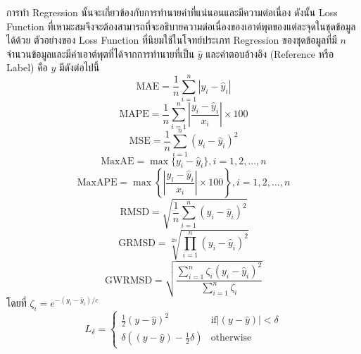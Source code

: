 การทำ Regression นั้นจะเกี่ยวข้องกับการทำนายค่าที่แน่นอนและมีความต่อเนื่อง ดังนั้น Loss Function ที่เหามะสมจึงจะต้องสามารถที่จะอธิบายความต่อเนื่องของเอาต์พุตของแต่ละจุดในชุดข้อมูลได้ด้วย ตัวอย่างของ Loss Function ที่นิยมใช้ในโจทย์ประเภท Regression ของชุดข้อมูลที่มี
$n$ จำนวนข้อมูลและมีค่าเอาต์พุตที่ได้จากการทำนายที่เป็น $\hat{y}$ และคำตอบอ้างอิง (Reference หรือ Label) คือ $y$ มีดังต่อไปนี้
%
\begin{equation}\label{eq:mae}
    \text{MAE} = \frac{1}{n} \sum_{i=1}^{n} | y_{i} - \hat{y}_{i} |
\end{equation}
%
\begin{equation}\label{eq:mape}
    \text{MAPE} = \frac{1}{n} \sum_{i=1}^{n} \left| \frac{y_{i} - \hat{y}_{i}}{x_{i}} \right| \times 100
\end{equation}
%
\begin{equation}\label{eq:mse}
    \text{MSE} = \frac{1}{n} \sum_{i=1}^{n} \left( y_{i} - \hat{y}_{i} \right)^2
\end{equation}
%
\begin{equation}\label{eq:maxae}
    \text{MaxAE} = \max\{y_{i} - \hat{y}_{i}\}, i = 1, 2, ..., n
\end{equation}
%
\begin{equation}\label{eq:maxape}
    \text{MaxAPE} = \max\left\{\left| \frac{y_{i} - \hat{y}_{i}}{x_{i}} \right| \times 100 \right\}, i = 1, 2,
    ..., n
\end{equation}
%
\begin{equation}\label{eq:rmsd}
    \text{RMSD} = \sqrt{ \frac{1}{n} \sum_{i=1}^{n} (y_{i} - \hat{y}_{i})^{2} }
\end{equation}
%
\begin{equation}\label{eq:grmsd}
    \text{GRMSD} = \sqrt[2n]{ \prod_{i=1}^{n} (y_{i} - \hat{y}_{i})^{2} }
\end{equation}
%
\begin{equation}\label{eq:gwrmsd}
    \text{GWRMSD} = \sqrt{\frac{\sum_{i=1}^{n} \zeta_{i} (y_{i} - \hat{y}_{i})^{2}}{\sum_{i=1}^{n} \zeta_{i}}}
\end{equation}
%
\noindent โดยที่ $\zeta_{i} = e^{-(y_{i} - \hat{y}_{i}) / c}$
%
\begin{equation}\label{eq:huber}
    L_{\delta}=
    \left\{\begin{matrix}
        \frac{1}{2}(y - \hat{y})^{2}             & \text{if} \left | (y - \hat{y})  \right | < \delta \\
        \delta ((y - \hat{y}) - \frac1 2 \delta) & \text{otherwise}
    \end{matrix}\right.
\end{equation}


